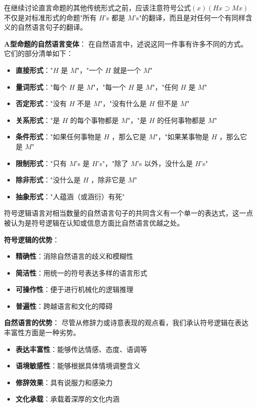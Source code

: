 \begin{theorembox}[title=自然语言表达的多样性与符号逻辑的统一性]
在继续讨论直言命题的其他传统形式之前，应该注意符号公式$(x)(H x \supset M x)$不仅是对标准形式的命题"所有 $H$'s 都是 $M$'s"的翻译，而且是对任何一个有同样含义的自然语言句子的翻译。\cite{brown1954}

\textbf{A型命题的自然语言变体}：
在自然语言中，述说这同一件事有许多不同的方式。它们的部分清单如下：
\begin{itemize}
\item \textbf{直接形式}："$H$ 是 $M$"，"一个 $H$ 就是一个 $M$"
\item \textbf{量词形式}："每个 $H$ 是 $M$"，"每一个 $H$ 是 $M$"，"任何 $H$ 是 $M$"
\item \textbf{否定形式}："没有 $H$ 不是 $M$"，"没有什么是 $H$ 但不是 $M$"
\item \textbf{关系形式}："是 $H$ 的每个事物都是 $M$"，"是 $H$ 的任何事物都是 $M$"
\item \textbf{条件形式}："如果任何事物是 $H$ ，那么它是 $M$"，"如果某事物是 $H$ ，那么它是 $M$"
\item \textbf{限制形式}："只有 $M$'s 是 $H$'s"，"除了 $M$'s 以外，没什么是 $H$'s"
\item \textbf{除非形式}："没什么是 $H$ ，除非它是 $M$"
\item \textbf{抽象形式}："人蕴涵（或涵衍）有死"
\end{itemize}
\end{theorembox}

\begin{examplebox}[title=符号逻辑与自然语言的比较]
符号逻辑语言对相当数量的自然语言句子的共同含义有一个单一的表达式，这一点被认为是符号逻辑在认知或信息方面比自然语言优越之处。

\textbf{符号逻辑的优势}：
\begin{itemize}
\item \textbf{精确性}：消除自然语言的歧义和模糊性
\item \textbf{简洁性}：用统一的符号表达多样的语言形式
\item \textbf{可操作性}：便于进行机械化的逻辑推理
\item \textbf{普遍性}：跨越语言和文化的障碍
\end{itemize}

\textbf{自然语言的优势}：
尽管从修辞力或诗意表现的观点看，我们承认符号逻辑在表达丰富性方面是一种劣势。
\begin{itemize}
\item \textbf{表达丰富性}：能够传达情感、态度、语调等
\item \textbf{语境敏感性}：能够根据具体情境调整含义
\item \textbf{修辞效果}：具有说服力和感染力
\item \textbf{文化承载}：承载着深厚的文化内涵
\end{itemize}
\end{examplebox}

